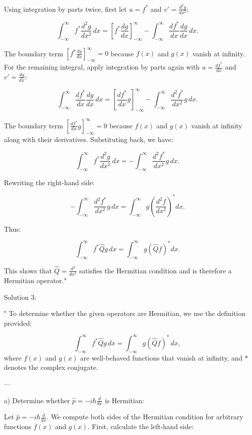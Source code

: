 Using integration by parts twice, first let $u = f^*$ and $v' = \frac{d^2 g}{dx^2}$:

\[
\int_{-\infty}^\infty f^* \frac{d^2 g}{dx^2} \, dx = \left[ f^* \frac{d g}{dx} \right]_{-\infty}^\infty - \int_{-\infty}^\infty \frac{d f^*}{dx} \frac{d g}{dx} \, dx.
\]

The boundary term $\left[ f^* \frac{d g}{dx} \right]_{-\infty}^\infty = 0$ because $f(x)$ and $g(x)$ vanish at infinity. For the remaining integral, apply integration by parts again with $u = \frac{d f^*}{dx}$ and $v' = \frac{d g}{dx}$:

\[
\int_{-\infty}^\infty \frac{d f^*}{dx} \frac{d g}{dx} \, dx = \left[ \frac{d f^*}{dx} g \right]_{-\infty}^\infty - \int_{-\infty}^\infty \frac{d^2 f^*}{dx^2} g \, dx.
\]

The boundary term $\left[ \frac{d f^*}{dx} g \right]_{-\infty}^\infty = 0$ because $f(x)$ and $g(x)$ vanish at infinity along with their derivatives. Substituting back, we have:

\[
\int_{-\infty}^\infty f^* \frac{d^2 g}{dx^2} \, dx = - \int_{-\infty}^\infty \frac{d^2 f^*}{dx^2} g \, dx.
\]

Rewriting the right-hand side:

\[
- \int_{-\infty}^\infty \frac{d^2 f^*}{dx^2} g \, dx = \int_{-\infty}^\infty g \left(\frac{d^2 f}{dx^2}\right)^* dx.
\]

Thus:

\[
\int_{-\infty}^\infty f^* \hat{Q} g \, dx = \int_{-\infty}^\infty g (\hat{Q} f)^* dx.
\]

This shows that $\hat{Q} = \frac{d^2}{dx^2}$ satisfies the Hermitian condition and is therefore a Hermitian operator."

Solution 3:

"
To determine whether the given operators are Hermitian, we use the definition provided:

\[
\int_{-\infty}^\infty f^* \hat{Q} g \, dx = \int_{-\infty}^\infty g (\hat{Q} f)^* \, dx,
\]
where \( f(x) \) and \( g(x) \) are well-behaved functions that vanish at infinity, and \( * \) denotes the complex conjugate. 

---

a) Determine whether \( \hat{p} = -i\hbar \frac{d}{dx} \) is Hermitian:

Let \( \hat{p} = -i\hbar \frac{d}{dx} \). We compute both sides of the Hermitian condition for arbitrary functions \( f(x) \) and \( g(x) \). First, calculate the left-hand side:

